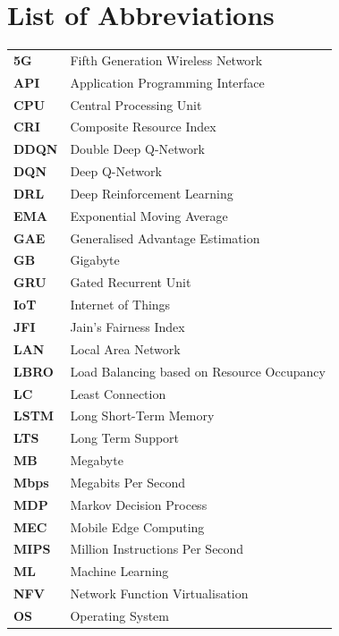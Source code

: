 \chapter*{List of Abbreviations}

\begin{tabular}{ll}
\textbf{5G}       & Fifth Generation Wireless Network \\
\textbf{API}      & Application Programming Interface \\
\textbf{CPU}      & Central Processing Unit \\
\textbf{CRI}      & Composite Resource Index \\
\textbf{DDQN}     & Double Deep Q-Network \\
\textbf{DQN}      & Deep Q-Network \\
\textbf{DRL}      & Deep Reinforcement Learning \\
\textbf{EMA}      & Exponential Moving Average \\
\textbf{GAE}      & Generalised Advantage Estimation \\
\textbf{GB}       & Gigabyte \\
\textbf{GRU}      & Gated Recurrent Unit \\
\textbf{IoT}      & Internet of Things \\
\textbf{JFI}      & Jain's Fairness Index \\
\textbf{LAN}      & Local Area Network \\
\textbf{LBRO}     & Load Balancing based on Resource Occupancy \\
\textbf{LC}       & Least Connection \\
\textbf{LSTM}     & Long Short-Term Memory \\
\textbf{LTS}      & Long Term Support \\
\textbf{MB}       & Megabyte \\
\textbf{Mbps}     & Megabits Per Second \\
\textbf{MDP}      & Markov Decision Process \\
\textbf{MEC}      & Mobile Edge Computing \\
\textbf{MIPS}     & Million Instructions Per Second \\
\textbf{ML}       & Machine Learning \\
\textbf{NFV}      & Network Function Virtualisation \\
\textbf{OS}       & Operating System \\

\end{tabular}
